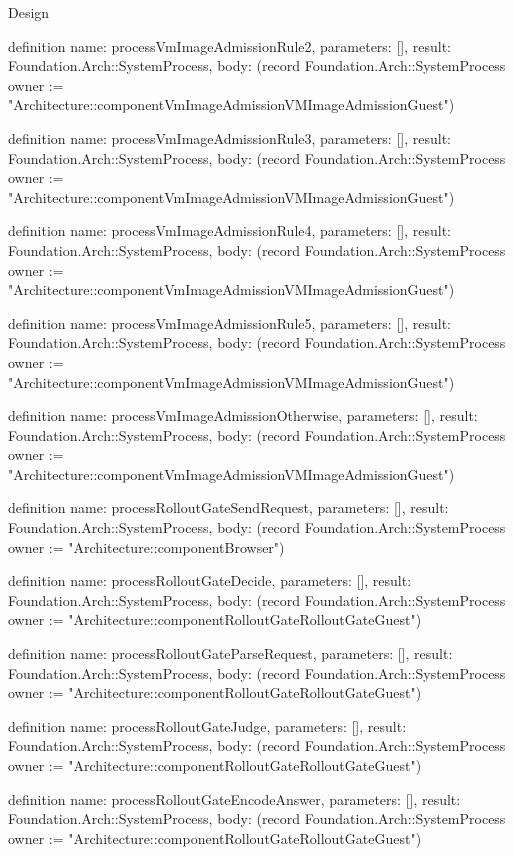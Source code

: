 \begin{lexlean}{Design}
\begin{semanticmodule}
definition{
  name: processVmImageAdmissionRule2,
  parameters: [],
  result: Foundation.Arch::SystemProcess,
  body: (record Foundation.Arch::SystemProcess {owner := "Architecture::componentVmImageAdmissionVMImageAdmissionGuest"})
}

definition{
  name: processVmImageAdmissionRule3,
  parameters: [],
  result: Foundation.Arch::SystemProcess,
  body: (record Foundation.Arch::SystemProcess {owner := "Architecture::componentVmImageAdmissionVMImageAdmissionGuest"})
}

definition{
  name: processVmImageAdmissionRule4,
  parameters: [],
  result: Foundation.Arch::SystemProcess,
  body: (record Foundation.Arch::SystemProcess {owner := "Architecture::componentVmImageAdmissionVMImageAdmissionGuest"})
}

definition{
  name: processVmImageAdmissionRule5,
  parameters: [],
  result: Foundation.Arch::SystemProcess,
  body: (record Foundation.Arch::SystemProcess {owner := "Architecture::componentVmImageAdmissionVMImageAdmissionGuest"})
}

definition{
  name: processVmImageAdmissionOtherwise,
  parameters: [],
  result: Foundation.Arch::SystemProcess,
  body: (record Foundation.Arch::SystemProcess {owner := "Architecture::componentVmImageAdmissionVMImageAdmissionGuest"})
}

definition{
  name: processRolloutGateSendRequest,
  parameters: [],
  result: Foundation.Arch::SystemProcess,
  body: (record Foundation.Arch::SystemProcess {owner := "Architecture::componentBrowser"})
}

definition{
  name: processRolloutGateDecide,
  parameters: [],
  result: Foundation.Arch::SystemProcess,
  body: (record Foundation.Arch::SystemProcess {owner := "Architecture::componentRolloutGateRolloutGateGuest"})
}

definition{
  name: processRolloutGateParseRequest,
  parameters: [],
  result: Foundation.Arch::SystemProcess,
  body: (record Foundation.Arch::SystemProcess {owner := "Architecture::componentRolloutGateRolloutGateGuest"})
}

definition{
  name: processRolloutGateJudge,
  parameters: [],
  result: Foundation.Arch::SystemProcess,
  body: (record Foundation.Arch::SystemProcess {owner := "Architecture::componentRolloutGateRolloutGateGuest"})
}

definition{
  name: processRolloutGateEncodeAnswer,
  parameters: [],
  result: Foundation.Arch::SystemProcess,
  body: (record Foundation.Arch::SystemProcess {owner := "Architecture::componentRolloutGateRolloutGateGuest"})
}


\end{semanticmodule}
\end{lexlean}
